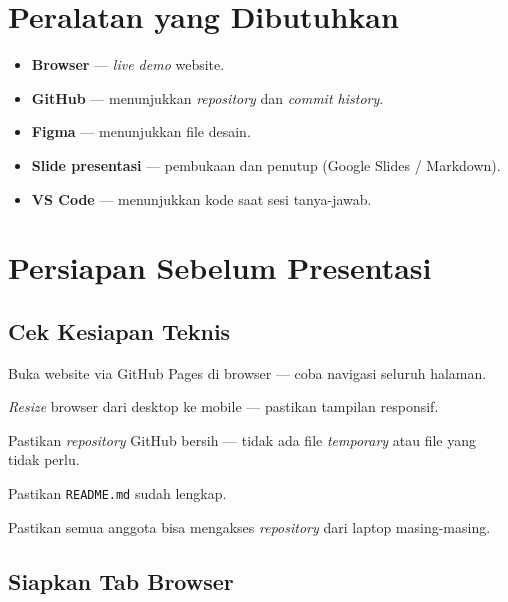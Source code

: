 \section{Peralatan yang Dibutuhkan}
\label{sec:peralatan-16}

\begin{itemize}
  \item \textbf{Browser} --- \emph{live demo} website.
  \item \textbf{GitHub} --- menunjukkan \emph{repository} dan \emph{commit history}.
  \item \textbf{Figma} --- menunjukkan file desain.
  \item \textbf{Slide presentasi} --- pembukaan dan penutup (Google Slides / Markdown).
  \item \textbf{VS Code} --- menunjukkan kode saat sesi tanya-jawab.
\end{itemize}

\section{Persiapan Sebelum Presentasi}
\label{sec:persiapan-sebelum-presentasi}

\subsection{Cek Kesiapan Teknis}
\label{subsec:cek-kesiapan}

\begin{langkah}
  \item Buka website via GitHub Pages di browser --- coba navigasi seluruh halaman.
  \item \emph{Resize} browser dari desktop ke mobile --- pastikan tampilan responsif.
  \item Pastikan \emph{repository} GitHub bersih --- tidak ada file \emph{temporary} atau file yang tidak perlu.
  \item Pastikan \texttt{README.md} sudah lengkap.
  \item Pastikan semua anggota bisa mengakses \emph{repository} dari laptop masing-masing.
\end{langkah}

\subsection{Siapkan Tab Browser}
\label{subsec:siapkan-tab}

